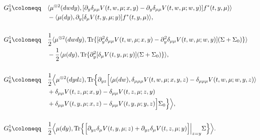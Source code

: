\documentclass{amsart}
\theoremstyle{definition}
\theoremstyle{remark}
\numberwithin{equation}{section}
\begin{document}
{\allowdisplaybreaks
\begin{align*}
G_3^1 \coloneqq  \quad & \langle \mu^{\otimes2}(dwdy), [ \partial_y\delta_{\mu\mu}  V(t, w,\mu; x,y)-\partial_y \delta_{\mu\mu}  V(t, w,\mu; w,y) ] f^*(t,y,\mu)\rangle  \\
&-\langle \mu(dy), \partial_{y}[   \delta_\mu  V(t, y,\mu; y)  ]
f^*(t,y,\mu)\rangle ,\\
& \\
G_4^1 \coloneqq  \quad
& \frac12\langle \mu^{\otimes2}(dwdy),\mbox{Tr}\{ [ \partial_y^2\delta_{\mu\mu}  V(t, w,\mu; x,y)-\partial_y^2 \delta_{\mu\mu}  V(t, w,\mu; w,y) ] (\Sigma+\Sigma_0)\}\rangle  \\
&-\frac12\langle \mu(dy),\mbox{Tr}\{ \partial_{y}^2[  \delta_\mu  V(t, y,\mu; y)  ] (\Sigma+\Sigma_0)\} \rangle,\\
& \\
G_6^1 \coloneqq  \quad &  \frac12\Big\langle\mu^{\otimes2}(dydz), {\rm Tr} \Big\{ \partial_{yz}\Big[
\langle\mu(dw),   \delta_{\mu\mu\mu}  V(t, w,\mu; x,y,z)- \delta_{\mu\mu\mu}  V(t, w,\mu; w,y,z) \rangle  \\
&+  \delta_{\mu\mu}  V(t, z,\mu; x,y)- \delta_{\mu\mu}  V(t, z,\mu; z,y)    \\
&+    \delta_{\mu\mu}  V(t, y,\mu; x,z)- \delta_{\mu\mu}  V(t, y,\mu; y,z)  \Big]\Sigma_0  \Big\}\Big\rangle, \\
&\\
G_9^1\coloneqq\quad  &   \frac{1}{2}\Big\langle \mu(dy),    \mbox{Tr} \Big\{\Big[\partial_{yz}\delta_\mu V(t, y, \mu; z) +\partial_{yz}\delta_\mu V(t, z, \mu; y) \Big]\Big|_{z=y}\Sigma\Big\} \Big \rangle.
\end{align*}
}
\end{document}
